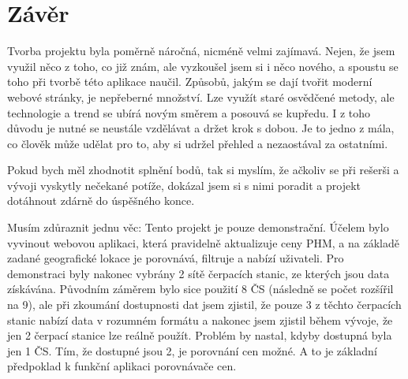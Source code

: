 \chapter{Závěr}

Tvorba projektu byla poměrně náročná, nicméně velmi zajímavá.
Nejen, že jsem využil něco z toho, co již znám, ale vyzkoušel jsem si
i něco nového, a spoustu se toho při tvorbě této aplikace naučil.
Způsobů, jakým se dají tvořit moderní webové stránky, je nepřeberné
množství. Lze využít staré osvědčené metody, ale technologie a trend
se ubírá novým směrem a posouvá se kupředu. I z toho důvodu je nutné
se neustále vzdělávat a držet krok s dobou. Je to jedno z mála, co člověk
může udělat pro to, aby si udržel přehled a nezaostával za ostatními.

Pokud bych měl zhodnotit splnění bodů, tak si myslím, že ačkoliv
se při rešerši a vývoji vyskytly nečekané potíže, dokázal jsem si s nimi
poradit a projekt dotáhnout zdárně do úspěšného konce.

Musím zdůraznit jednu věc: Tento projekt je pouze demonstrační.
Účelem bylo vyvinout webovou aplikaci, která pravidelně aktualizuje
ceny PHM, a na základě zadané geografické lokace je porovnává, filtruje
a nabízí uživateli. Pro demonstraci byly nakonec vybrány 2 sítě čerpacích
stanic, ze kterých jsou data získávána. Původním záměrem bylo sice použití
8 ČS (následně se počet rozšířil na 9), ale při zkoumání dostupnosti dat
jsem zjistil, že pouze 3 z těchto čerpacích stanic nabízí data v rozumném
formátu a nakonec jsem zjistil během vývoje, že jen 2 čerpací stanice
lze reálně použít. Problém by nastal, kdyby dostupná byla jen 1 ČS.
Tím, že dostupné jsou 2, je porovnání cen možné. A to je základní předpoklad
k funkční aplikaci porovnávače cen.

